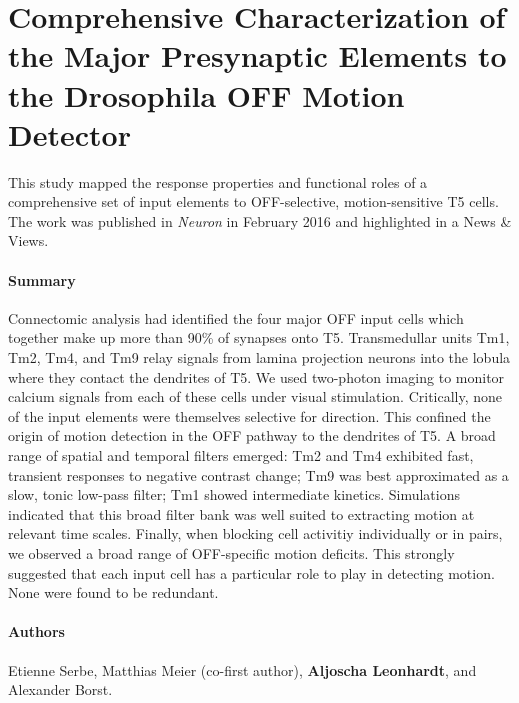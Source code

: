 \section{Comprehensive Characterization of the Major Presynaptic Elements to the Drosophila OFF Motion Detector}
\label{sct:manuscript_serbe}

This study mapped the response properties and functional roles of a comprehensive set of input elements to OFF-selective, motion-sensitive T5 cells. The work was published in \textit{Neuron} in February 2016 \citep{Serbe:2016ew} and highlighted in a News \& Views.

\paragraph{Summary}
Connectomic analysis had identified the four major OFF input cells which together make up more than 90\% of synapses onto T5. Transmedullar units Tm1, Tm2, Tm4, and Tm9 relay signals from lamina projection neurons into the lobula where they contact the dendrites of T5. We used two-photon imaging to monitor calcium signals from each of these cells under visual stimulation. Critically, none of the input elements were themselves selective for direction. This confined the origin of motion detection in the OFF pathway to the dendrites of T5. A broad range of spatial and temporal filters emerged: Tm2 and Tm4 exhibited fast, transient responses to negative contrast change; Tm9 was best approximated as a slow, tonic low-pass filter; Tm1 showed intermediate kinetics. Simulations indicated that this broad filter bank was well suited to extracting motion at relevant time scales. Finally, when blocking cell activitiy individually or in pairs, we observed a broad range of OFF-specific motion deficits. This strongly suggested that each input cell has a particular role to play in detecting motion. None were found to be redundant.

\paragraph{Authors} Etienne Serbe, Matthias Meier (co-first author), \textbf{Aljoscha Leonhardt}, and Alexander Borst.

